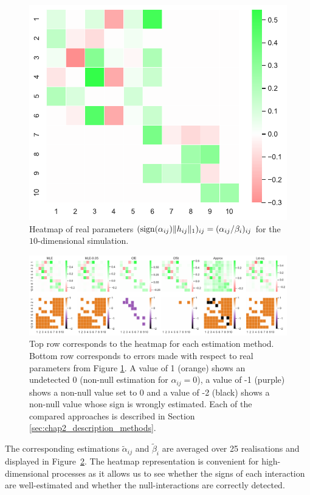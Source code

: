     {\begin{figure}
    \centering
    \includegraphics[clip,width=0.75\linewidth]{images/chapter3/Realheat.pdf}
    \caption{Heatmap of real parameters $(\operatorname{sign}(\alpha_{ij})\|h_{ij}\|_1)_{ij} = (\alpha_{ij}/\beta_i)_{ij}$ for the $10$-dimensional simulation.}
    \label{fig:chap2_heatmap_10}
    \end{figure}}
    {\begin{figure}
    \centering
    \includegraphics[clip, width=\linewidth]{images/chapter3/heatmap_hori.pdf}
    \caption{Top row corresponds to the heatmap for each estimation method. Bottom row corresponds to errors made with respect to real parameters from Figure \ref{fig:chap2_heatmap_10}. A value of 1 (orange) shows an undetected 0 (non-null estimation for $\alpha_{ij} = 0$), a value of -1 (purple) shows a non-null value set to 0 and a value of -2 (black) shows a non-null value whose sign is wrongly estimated. Each of the compared approaches is described in Section \ref{sec:chap2_description_methods}.}
    \label{fig:chap2_heatmap_estimated}
    \end{figure}}

    The corresponding estimations \(\tilde \alpha_{ij}\) and \(\tilde \beta_{i}\) are averaged over 25 realisations and displayed in Figure~\ref{fig:chap2_heatmap_estimated}.
    The heatmap representation is convenient for high-dimensional processes as it allows us to see whether the signs of each interaction are well-estimated and whether the null-interactions are correctly detected.


